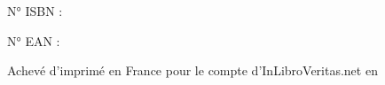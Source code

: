 {\NoAutoSpaceBeforeFDP {}\AutoSpaceBeforeFDP}
\printindex
\tableofcontents
\newpage
\thispagestyle{empty}
\null{}
\MakeTitre{} \version{}\par
{}
N° ISBN : \isbn{}\par
N° EAN : \ean{}\par
{}
Achevé d'imprimé en France pour le compte d'InLibroVeritas.net en \anneedepot{}\par
{}

